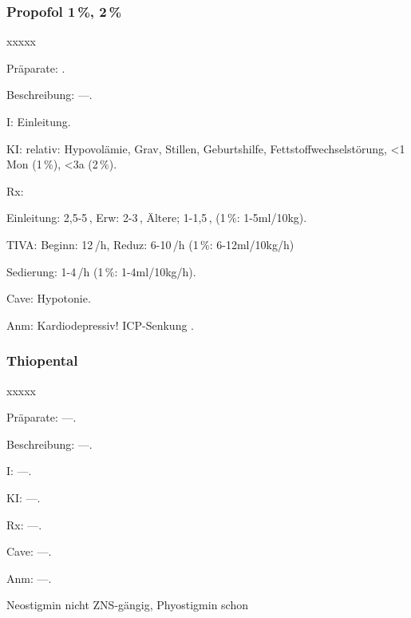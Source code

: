 \subsubsection{Propofol 1\,\%, 2\,\%}

\begin{labeling}[~]{xxxxx}
  \item[Präparate:]  .
  \item[Beschreibung:] ---.
  \item[I:]   Einleitung.
  \item[KI:]   relativ: Hypovolämie, Grav, Stillen, Geburtshilfe,
  Fettstoffwechselstörung, {\textless}1 Mon (1\,\%), {\textless}3a (2\,\%).
  \item[Rx:]
  \begin{inparaitem}
    \item Einleitung: 2,5-5\,, Erw:
    2-3\,, Ältere; 1-1,5\,, (1\,\%: 1-5ml/10kg).
    \item TIVA: Beginn: 12\,/h, Reduz: 6-10\,/h (1\,\%: 6-12ml/10kg/h)
    \item Sedierung: 1-4\,/h (1\,\%: 1-4ml/10kg/h).
  \end{inparaitem}
  \item[Cave:]   Hypotonie.
  \item[Anm:]  Kardiodepressiv! ICP-Senkung .
\end{labeling}

\subsubsection{Thiopental }

\begin{labeling}[~]{xxxxx}
  \item[Präparate:]---.
  \item[Beschreibung:] ---.
  \item[I:] ---.
  \item[KI:] ---.
  \item[Rx:] ---.
  \item[Cave:] ---.
  \item[Anm:] ---.
\end{labeling}



{
Neostigmin nicht ZNS-gängig, Phyostigmin schon}





